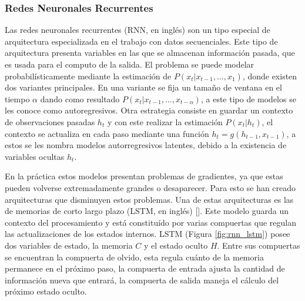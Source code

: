 \subsubsection{Redes Neuronales Recurrentes}

Las redes neuronales recurrentes (RNN, en inglés) son
un tipo especial de arquitectura especializada en el trabajo con datos secuenciales. Este tipo de arquitectura
presenta variables en las que se almacenan información pasada, que es usada para el computo de la salida. El 
problema se puede modelar probabilísticamente mediante la estimación de $P(x_t | x_{t-1}, \dots, x_{1})$,
donde existen dos variantes principales. En una variante se fija un tamaño de ventana en el tiempo $\alpha$ 
dando como resultado $P(x_t | x_{t-1}, \dots, x_{t-\alpha})$, a este tipo de modelos se les conoce como autoregresivos. 
Otra estrategia consiste en guardar un contexto de observaciones pasadas $h_t$ y con este realizar la estimación 
$P(x_t | h_t)$, el contexto se actualiza en cada paso mediante una función $h_t = g(h_{t-1}, x_{t-1})$, a estos 
se les nombra modelos autorregresivos latentes, debido a la existencia de variables ocultas $h_t$. 

En la práctica estos modelos presentan problemas de gradientes, ya que estas pueden volverse extremadamente grandes o 
desaparecer.
Para esto se han creado arquitecturas que disminuyen estos problemas. Una de estas arquitecturas es las de memorias
de corto largo plazo (LSTM, en inglés) [\cite{hochreiter1997long}].
Este modelo guarda un contexto del procesamiento y está constituído por varias compuertas que regulan las 
actualizaciones de los estados internos. LSTM (Figura \ref{fig:rnn_lstm}) posee dos variables de estado, la memoria 
$C$ y el estado oculto $H$. Entre sus compuertas se encuentran la compuerta de olvido, esta regula cuánto de la 
memoria permanece en el próximo paso, la compuerta de entrada ajusta la cantidad de información nueva que entrará, 
la compuerta de salida maneja el cálculo del próximo estado oculto.

